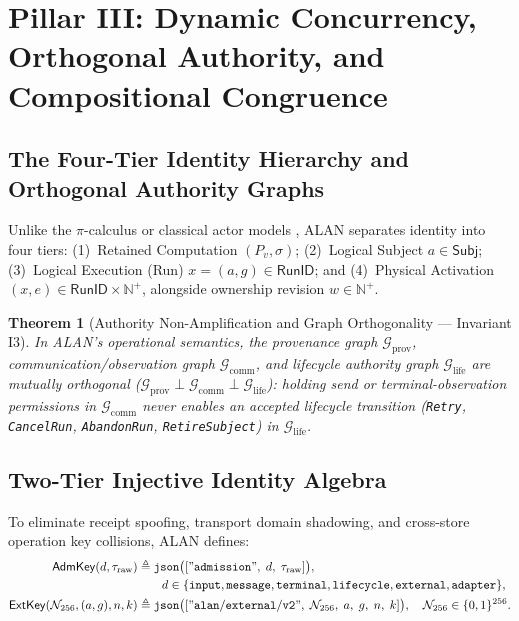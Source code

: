 \documentclass[11pt,a4paper]{article}
\newtheorem{theorem}{Theorem}[section]
\theoremstyle{definition}
\theoremstyle{remark}
\newcommand{\Subj}{\mathsf{Subj}}
\newcommand{\RunID}{\mathsf{RunID}}
\begin{document}
\section{Pillar III: Dynamic Concurrency, Orthogonal Authority, and Compositional Congruence}

\subsection{The Four-Tier Identity Hierarchy and Orthogonal Authority Graphs}
Unlike the $\pi$-calculus \cite{milner1992calculus} or classical actor models \cite{hewitt1973universal,agha1997foundation}, ALAN separates identity into four tiers: (1)~Retained Computation $(P_v, \sigma)$; (2)~Logical Subject $a \in \Subj$; (3)~Logical Execution (Run) $x = (a, g) \in \RunID$; and (4)~Physical Activation $(x, e) \in \RunID \times \mathbb{N}^+$, alongside ownership revision $w \in \mathbb{N}^+$.

\begin{theorem}[Authority Non-Amplification and Graph Orthogonality --- Invariant I3]
\label{thm:orthogonality}
In ALAN's operational semantics, the provenance graph $\mathcal{G}_{\text{prov}}$, communication/observation graph $\mathcal{G}_{\text{comm}}$, and lifecycle authority graph $\mathcal{G}_{\text{life}}$ are mutually orthogonal ($\mathcal{G}_{\text{prov}} \perp \mathcal{G}_{\text{comm}} \perp \mathcal{G}_{\text{life}}$): holding send or terminal-observation permissions in $\mathcal{G}_{\text{comm}}$ never enables an accepted lifecycle transition (\texttt{Retry}, \texttt{CancelRun}, \texttt{AbandonRun}, \texttt{RetireSubject}) in $\mathcal{G}_{\text{life}}$.
\end{theorem}

\subsection{Two-Tier Injective Identity Algebra}
To eliminate receipt spoofing, transport domain shadowing, and cross-store operation key collisions, ALAN defines:
\begin{align}
  \mathsf{AdmKey}(d, \tau_{\text{raw}}) &\triangleq \mathtt{json}\big([\mathtt{"admission"},\; d,\; \tau_{\text{raw}}]\big), \nonumber\\
  &\qquad d \in \{\mathtt{input},\mathtt{message},\mathtt{terminal},\mathtt{lifecycle},\mathtt{external},\mathtt{adapter}\}, \\
  \mathsf{ExtKey}(\mathcal{N}_{256}, (a,g), n, k) &\triangleq \mathtt{json}\big([\mathtt{"alan/external/v2"},\; \mathcal{N}_{256},\; a,\; g,\; n,\; k]\big), \quad \mathcal{N}_{256} \in \{0,1\}^{256}.
\end{align}
\end{document}
